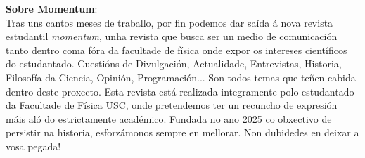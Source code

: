 
\begin{minipage}[t]{0.72\textwidth}
    \vspace{-0.3cm}
    \begin{minipage}[t]{\hsize}
        \vfill
        \begin{minipage}[t]{0.9\textwidth}
            \vfill
            \vspace{2cm}
            {\Huge \color{Resalte!75!black} \textbf{Sobre Momentum}:} \\[1cm]Tras uns cantos meses de traballo, por fin podemos dar saída á nova revista estudantil \textit{momentum}, unha revista que busca ser un medio de comunicación tanto dentro coma fóra da facultade de física onde expor os intereses científicos do estudantado. Cuestións de Divulgación, Actualidade, Entrevistas, Historia, Filosofía da Ciencia, Opinión, Programación... Son todos temas que teñen cabida dentro deste proxecto. Esta revista está realizada integramente polo estudantado da Facultade de Física USC, onde pretendemos ter un recuncho de expresión máis aló do estrictamente académico. Fundada no ano 2025 co obxectivo de persistir na historia, esforzámonos sempre en mellorar. Non dubidedes en deixar a vosa pegada!
        \end{minipage}
    \end{minipage}
\end{minipage}
